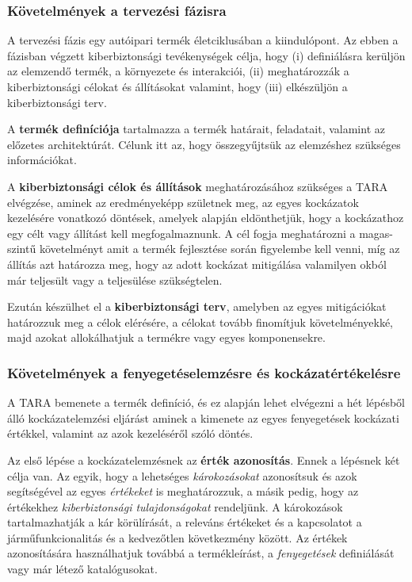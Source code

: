 \subsubsection{Követelmények a tervezési fázisra}
A tervezési fázis egy autóipari termék életciklusában a kiindulópont. Az ebben a fázisban végzett kiberbiztonsági tevékenységek célja, hogy (i) definiálásra kerüljön az elemzendő termék, a környezete és interakciói, (ii) meghatározzák a kiberbiztonsági célokat és állításokat valamint, hogy (iii) elkészüljön a kiberbiztonsági terv.

A \textbf{termék definíciója} tartalmazza a termék határait, feladatait, valamint az előzetes architektúrát. Célunk itt az, hogy összegyűjtsük az elemzéshez szükséges információkat.

A \textbf{kiberbiztonsági célok és állítások} meghatározásához szükséges a TARA elvégzése, aminek az eredményeképp születnek meg, az egyes kockázatok kezelésére vonatkozó döntések, amelyek alapján eldönthetjük, hogy a kockázathoz egy célt vagy állítást kell megfogalmaznunk. A cél fogja meghatározni a magas-szintű követelményt amit a termék fejlesztése során figyelembe kell venni, míg az állítás azt határozza meg, hogy az adott kockázat mitigálása valamilyen okból már teljesült vagy a teljesülése szükségtelen.

Ezután készülhet el a \textbf{kiberbiztonsági terv}, amelyben az egyes mitigációkat határozzuk meg a célok elérésére, a célokat tovább finomítjuk követelményekké, majd azokat allokálhatjuk a termékre vagy egyes komponensekre.

\subsubsection{Követelmények a fenyegetéselemzésre és kockázatértékelésre}
A TARA bemenete a termék definíció, és ez alapján lehet elvégezni a hét lépésből álló kockázatelemzési eljárást aminek a kimenete az egyes fenyegetések kockázati értékkel, valamint az azok kezeléséről szóló döntés.

Az első lépése a kockázatelemzésnek az \textbf{érték azonosítás}. Ennek a lépésnek két célja van. Az egyik, hogy a lehetséges \textit{károkozásokat} azonosítsuk és azok segítségével az egyes \textit{értékeket} is meghatározzuk, a másik pedig, hogy az értékekhez \textit{kiberbiztonsági tulajdonságokat} rendeljünk. 
A károkozások tartalmazhatják a kár körülírását, a releváns értékeket és a kapcsolatot a járműfunkcionalitás és a kedvezőtlen következmény között.
Az értékek azonosítására használhatjuk továbbá a termékleírást, a \textit{fenyegetések} definiálását vagy már létező katalógusokat.


